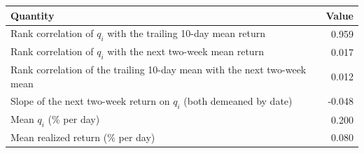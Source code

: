 \begin{tabular}{lr}
\toprule
Quantity & Value \\
\midrule
Rank correlation of $q_i$ with the trailing 10-day mean return & 0.959 \\
Rank correlation of $q_i$ with the next two-week mean return & 0.017 \\
Rank correlation of the trailing 10-day mean with the next two-week mean & 0.012 \\
Slope of the next two-week return on $q_i$ (both demeaned by date) & -0.048 \\
Mean $q_i$ (\% per day) & 0.200 \\
Mean realized return (\% per day) & 0.080 \\
\bottomrule
\end{tabular}
